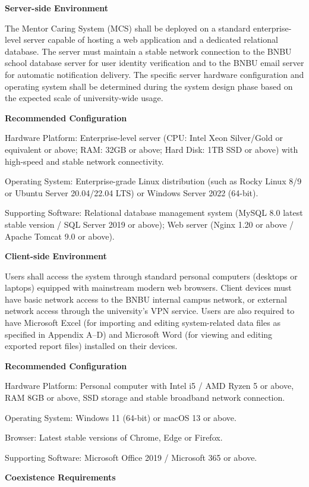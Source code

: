 \textbf{Server-side Environment}

The Mentor Caring System (MCS) shall be deployed on a standard enterprise-level server capable of hosting a web application and a dedicated relational database. The server must maintain a stable network connection to the BNBU school database server for user identity verification and to the BNBU email server for automatic notification delivery. The specific server hardware configuration and operating system shall be determined during the system design phase based on the expected scale of university-wide usage.

\textbf{Recommended Configuration}

Hardware Platform: Enterprise-level server (CPU: Intel Xeon Silver/Gold or equivalent or above; RAM: 32GB or above; Hard Disk: 1TB SSD or above) with high-speed and stable network connectivity.

Operating System: Enterprise-grade Linux distribution (such as Rocky Linux 8/9 or Ubuntu Server 20.04/22.04 LTS) or Windows Server 2022 (64-bit).

Supporting Software: Relational database management system (MySQL 8.0 latest stable version / SQL Server 2019 or above); Web server (Nginx 1.20 or above / Apache Tomcat 9.0 or above).

\textbf{Client-side Environment}

Users shall access the system through standard personal computers (desktops or laptops) equipped with mainstream modern web browsers. Client devices must have basic network access to the BNBU internal campus network, or external network access through the university's VPN service. Users are also required to have Microsoft Excel (for importing and editing system-related data files as specified in Appendix A--D) and Microsoft Word (for viewing and editing exported report files) installed on their devices.

\textbf{Recommended Configuration}

Hardware Platform: Personal computer with Intel i5 / AMD Ryzen 5 or above, RAM 8GB or above, SSD storage and stable broadband network connection.

Operating System: Windows 11 (64-bit) or macOS 13 or above.

Browser: Latest stable versions of Chrome, Edge or Firefox.

Supporting Software: Microsoft Office 2019 / Microsoft 365 or above.

\textbf{Coexistence Requirements}

